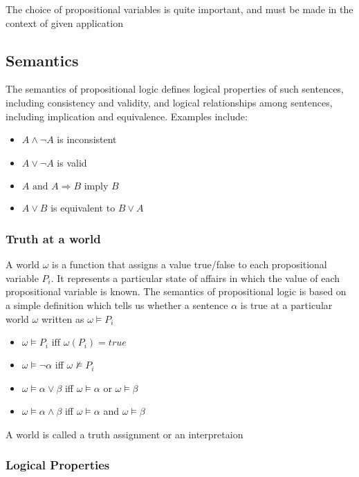 \documentclass[11pt]{article}
\begin{document}
The choice of propositional variables is quite important, and must be made in the context of given application

\subsection{Semantics}

The semantics of propositional logic defines logical properties of such sentences, including consistency and validity, and logical relationships among sentences, including implication and equivalence. Examples include:
\begin{itemize}
\item $A \land \lnot A$ is inconsistent
\item $A \lor \lnot A$ is valid
\item $A \text{ and } A \Rightarrow B \text{ imply } B$
\item $A \lor B$ is equivalent to $B \lor A$
\end{itemize}

\subsubsection{Truth at a world}

A world $\omega$ is a function that assigns a value true/false to each propositional variable $P_i$. It represents a particular state of affairs in which the value of each propositional variable is known. The semantics of propositional logic is based on a simple definition which tells us whether a sentence $\alpha$ is true at a particular world $\omega$ written as $\omega \models P_i$
\begin{itemize}
\item $\omega \models P_i \text{ iff } \omega(P_i) = true$
\item $\omega \models \lnot \alpha $ iff $\omega \not\models P_i$
\item $\omega \models \alpha \lor \beta$ iff $\omega \models \alpha$ or $\omega \models \beta$
\item $\omega \models \alpha \land \beta$ iff $\omega \models \alpha$ and $\omega \models \beta$
\end{itemize}
A world is called a truth assignment or an interpretaion

\subsubsection{Logical Properties}
\end{document}
